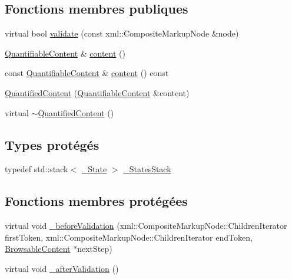 \subsection*{Fonctions membres publiques}
\begin{DoxyCompactItemize}
\item 
virtual bool \hyperlink{classdtd_1_1_quantified_content_a83733f23442035bdbcd976723ed753a4}{validate} (const xml::CompositeMarkupNode \&node)
\item 
\hyperlink{classdtd_1_1_quantifiable_content}{QuantifiableContent} \& \hyperlink{classdtd_1_1_quantified_content_a5af034175edfa37f250b79b4c3ed3b92}{content} ()
\item 
const \hyperlink{classdtd_1_1_quantifiable_content}{QuantifiableContent} \& \hyperlink{classdtd_1_1_quantified_content_a29617e5aff808d66520c20626d673cae}{content} () const 
\item 
\hyperlink{classdtd_1_1_quantified_content_a687df58cee3795a5e47dfed39e6c6bf8}{QuantifiedContent} (\hyperlink{classdtd_1_1_quantifiable_content}{QuantifiableContent} \&content)
\item 
virtual \hyperlink{classdtd_1_1_quantified_content_ae67cf8463f4df5598acb62a0ffc06b39}{$\sim$QuantifiedContent} ()
\end{DoxyCompactItemize}
\subsection*{Types protégés}
\begin{DoxyCompactItemize}
\item 
typedef std::stack$<$ \hyperlink{structdtd_1_1_quantifiable_content_1_1___state}{\_\-State} $>$ \hyperlink{classdtd_1_1_quantified_content_af5a78d608bdaba704815995fbbe40f10}{\_\-StatesStack}
\end{DoxyCompactItemize}
\subsection*{Fonctions membres protégées}
\begin{DoxyCompactItemize}
\item 
virtual void \hyperlink{classdtd_1_1_quantified_content_a7be3fc2bcf3859567fd276e0d364b42e}{\_\-beforeValidation} (xml::CompositeMarkupNode::ChildrenIterator firstToken, xml::CompositeMarkupNode::ChildrenIterator endToken, \hyperlink{classdtd_1_1_browsable_content}{BrowsableContent} $\ast$nextStep)
\item 
virtual void \hyperlink{classdtd_1_1_quantified_content_a0830885ef44406a3ce571d8ad70fc014}{\_\-afterValidation} ()
\end{DoxyCompactItemize}
